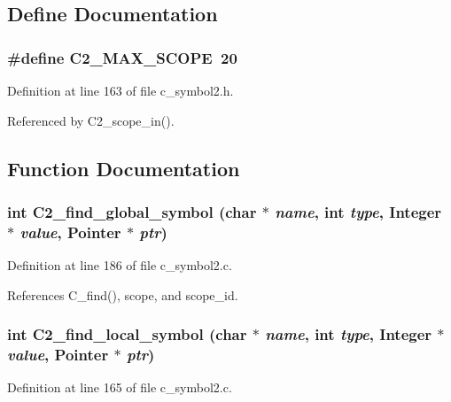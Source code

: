 \subsection{Define Documentation}
\subsubsection{\setlength{\rightskip}{0pt plus 5cm}\#define C2\_\-MAX\_\-SCOPE~20}\label{c__symbol2_8h_6260096f2d492f472be0b165da97a38d}




Definition at line 163 of file c\_\-symbol2.h.

Referenced by C2\_\-scope\_\-in().

\subsection{Function Documentation}
\subsubsection{\setlength{\rightskip}{0pt plus 5cm}int C2\_\-find\_\-global\_\-symbol (char $\ast$ {\em name}, int {\em type}, \bf{Integer} $\ast$ {\em value}, \bf{Pointer} $\ast$ {\em ptr})}\label{c__symbol2_8h_ce350e8f490545882fcf082a3adfc449}




Definition at line 186 of file c\_\-symbol2.c.

References C\_\-find(), scope, and scope\_\-id.
\subsubsection{\setlength{\rightskip}{0pt plus 5cm}int C2\_\-find\_\-local\_\-symbol (char $\ast$ {\em name}, int {\em type}, \bf{Integer} $\ast$ {\em value}, \bf{Pointer} $\ast$ {\em ptr})}\label{c__symbol2_8h_b7b5d5863b495f23cf2379354b71c5b0}




Definition at line 165 of file c\_\-symbol2.c.

